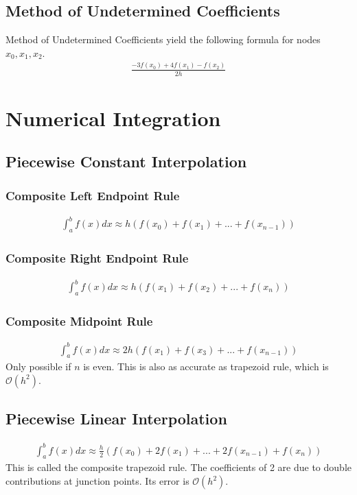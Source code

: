 \documentclass[12pt, letterpaper]{article}
\begin{document}
\subsection{Method of Undetermined Coefficients}
Method of Undetermined Coefficients yield the following formula for nodes $x_0,x_1,x_2$.
\begin{align*}
    \frac{-3f(x_0)+4f(x_1)-f(x_2)}{2h}
\end{align*}

\newpage
\section{Numerical Integration}
\subsection{Piecewise Constant Interpolation}
\subsubsection{Composite Left Endpoint Rule}
\begin{align*}
    \int_{a}^{b}f(x)dx \approx h(f(x_0)+f(x_1)+...+f(x_{n-1}))
\end{align*}
\subsubsection{Composite Right Endpoint Rule}
\begin{align*}
    \int_{a}^{b}f(x)dx \approx h(f(x_1)+f(x_2)+...+f(x_{n}))
\end{align*}
\subsubsection{Composite Midpoint Rule}
\begin{align*}
    \int_{a}^{b}f(x)dx \approx 2h(f(x_1)+f(x_3)+...+f(x_{n-1}))
\end{align*}
Only possible if $n$ is even. This is also as accurate as trapezoid rule, which is $\mathcal{O}(h^2)$.
\subsection{Piecewise Linear Interpolation}
\begin{align*}
    \int_{a}^{b}f(x)dx \approx \frac{h}{2} (f(x_0)+2f(x_1)+...+2f(x_{n-1})+f(x_n))
\end{align*}
This is called the composite trapezoid rule. The coefficients of 2 are due to 
double contributions at junction points. Its error is $\mathcal{O}(h^2)$.
\end{document}
